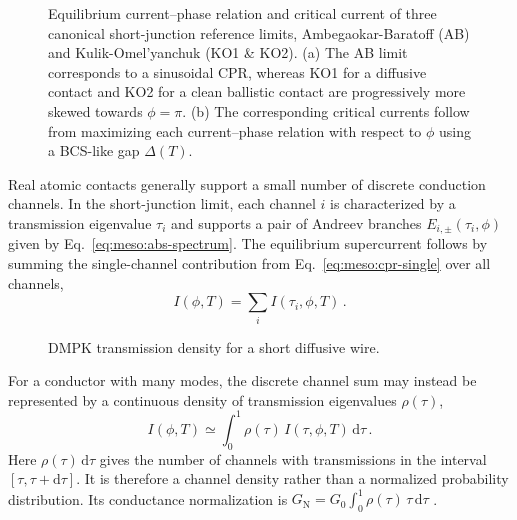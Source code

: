             \begin{figure}[t]
                \centering
                \hfill
                \caption{
                    Equilibrium current--phase relation and critical current of three canonical short-junction reference limits, Ambegaokar-Baratoff (AB) and Kulik-Omel'yanchuk (KO1 \& KO2).
                    (a) The AB limit corresponds to a sinusoidal CPR, whereas KO1 for a diffusive contact and KO2 for a clean ballistic contact are progressively more skewed towards $\phi=\pi$.
                    (b) The corresponding critical currents follow from maximizing each current--phase relation with respect to $\phi$ using a BCS-like gap $\Delta(T)$.
                    }
                \label{fig:meso:abs-ko}
            \end{figure}

            Real atomic contacts generally support a small number of discrete conduction channels. In the short-junction limit, each channel $i$ is characterized by a transmission eigenvalue $\tau_i$ and supports a pair of Andreev branches $E_{i,\pm}(\tau_i,\phi)$ given by Eq.~\eqref{eq:meso:abs-spectrum}. The equilibrium supercurrent follows by summing the single-channel contribution from Eq.~\eqref{eq:meso:cpr-single} over all channels,
            \begin{equation}
                I(\phi,T)=\sum_i I(\tau_i,\phi,T)\,.
                \label{eq:meso:cpr-multichannel}
            \end{equation}

            \begin{figure}
                \captionsetup{format=plain}%
                \centering
                \vspace{-1.0em}
                \caption{
                    DMPK transmission density for a short diffusive wire.
                    }
                \label{fig:meso:ko-rho}
            \end{figure}

            For a conductor with many modes, the discrete channel sum may instead be represented by a continuous density of transmission eigenvalues $\rho(\tau)$,
            \begin{equation}
                I(\phi,T)\simeq \int_0^1 \rho(\tau)\, I(\tau,\phi,T)\,\mathrm d\tau\,.
            \end{equation}
            Here $\rho(\tau)\,\mathrm d\tau$ gives the number of channels with transmissions in the interval $[\tau,\tau+\mathrm d\tau]$. It is therefore a channel density rather than a normalized probability distribution. Its conductance normalization is $G_\mathrm N=G_0\int_0^1 \rho(\tau)\,\tau\,\mathrm d\tau$ \cite{beenakker_josephson_1991,beenakker_quantum_1992}.

